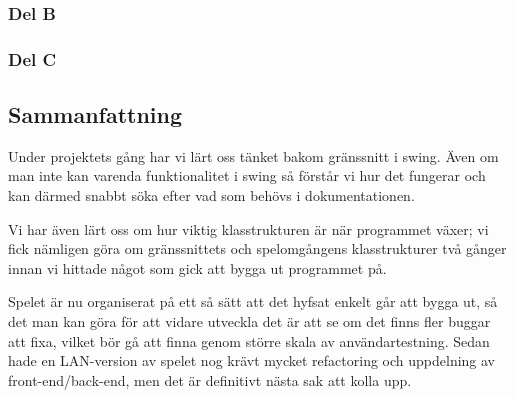 \documentclass[10pt,a4paper]{article}
\begin{document}
\subsubsection*{Del B}

\subsubsection*{Del C}

\subsection*{Sammanfattning}

Under projektets gång har vi lärt oss tänket bakom gränssnitt i swing. Även
om man inte kan varenda funktionalitet i swing så förstår vi hur det
fungerar och kan därmed snabbt söka efter vad som behövs i dokumentationen.

Vi har även lärt oss om hur viktig klasstrukturen är när programmet växer;
vi fick nämligen göra om gränssnittets och spelomgångens klasstrukturer två
gånger innan vi hittade något som gick att bygga ut programmet på.

Spelet är nu organiserat på ett så sätt att det hyfsat enkelt går att bygga
ut, så det man kan göra för att vidare utveckla det är att se om det finns
fler buggar att fixa, vilket bör gå att finna genom större skala av
användartestning. Sedan hade en LAN-version av spelet nog krävt mycket
refactoring och uppdelning av front-end/back-end, men det är definitivt
nästa sak att kolla upp.
\end{document}
